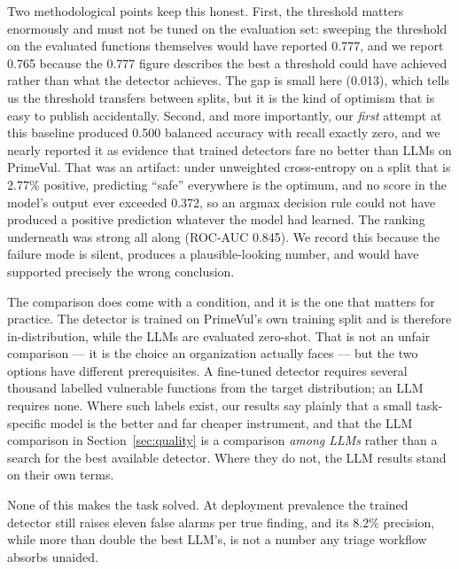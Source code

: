 \documentclass[computers,article,submit,moreauthors]{Definitions/mdpi}
\begin{document}
Two methodological points keep this honest. First, the threshold matters enormously and must not be tuned on the evaluation set: sweeping the threshold on the evaluated functions themselves would have reported 0.777, and we report 0.765 because the 0.777 figure describes the best a threshold could have achieved rather than what the detector achieves. The gap is small here (0.013), which tells us the threshold transfers between splits, but it is the kind of optimism that is easy to publish accidentally. Second, and more importantly, our \emph{first} attempt at this baseline produced 0.500 balanced accuracy with recall exactly zero, and we nearly reported it as evidence that trained detectors fare no better than LLMs on PrimeVul. That was an artifact: under unweighted cross-entropy on a split that is 2.77\% positive, predicting ``safe'' everywhere is the optimum, and no score in the model's output ever exceeded 0.372, so an argmax decision rule could not have produced a positive prediction whatever the model had learned. The ranking underneath was strong all along (ROC-AUC 0.845). We record this because the failure mode is silent, produces a plausible-looking number, and would have supported precisely the wrong conclusion.

The comparison does come with a condition, and it is the one that matters for practice. The detector is trained on PrimeVul's own training split and is therefore in-distribution, while the LLMs are evaluated zero-shot. That is not an unfair comparison --- it is the choice an organization actually faces --- but the two options have different prerequisites. A fine-tuned detector requires several thousand labelled vulnerable functions from the target distribution; an LLM requires none. Where such labels exist, our results say plainly that a small task-specific model is the better and far cheaper instrument, and that the LLM comparison in Section~\ref{sec:quality} is a comparison \emph{among LLMs} rather than a search for the best available detector. Where they do not, the LLM results stand on their own terms.

None of this makes the task solved. At deployment prevalence the trained detector still raises eleven false alarms per true finding, and its 8.2\% precision, while more than double the best LLM's, is not a number any triage workflow absorbs unaided.
\end{document}
